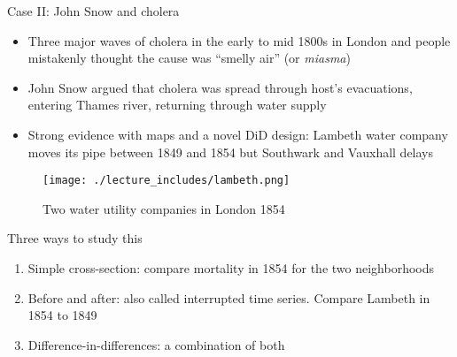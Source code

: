 \documentclass{beamer}
\begin{document}
\begin{frame}{Case II: John Snow and cholera}

\begin{itemize}
\item Three major waves of cholera in the early to mid 1800s in London and people mistakenly thought the cause was ``smelly air'' (or \emph{miasma})
\item John Snow argued that cholera was spread through host's evacuations, entering Thames river, returning through water supply
\item Strong evidence with maps and a novel DiD design: Lambeth water company moves its pipe between 1849 and 1854 but Southwark and Vauxhall delays
\end{itemize}

\end{frame}


\begin{frame}

	\begin{figure}
	\caption{Two water utility companies in London 1854}
	\texttt{[image: ./lecture\_includes/lambeth.png]}
	\end{figure}


\end{frame}


\begin{frame}{Three ways to study this}

\begin{enumerate}
\item Simple cross-section: compare mortality in 1854 for the two neighborhoods
\item Before and after: also called interrupted time series. Compare Lambeth in 1854 to 1849
\item Difference-in-differences: a combination of both
\end{enumerate}

\end{frame}
\end{document}
